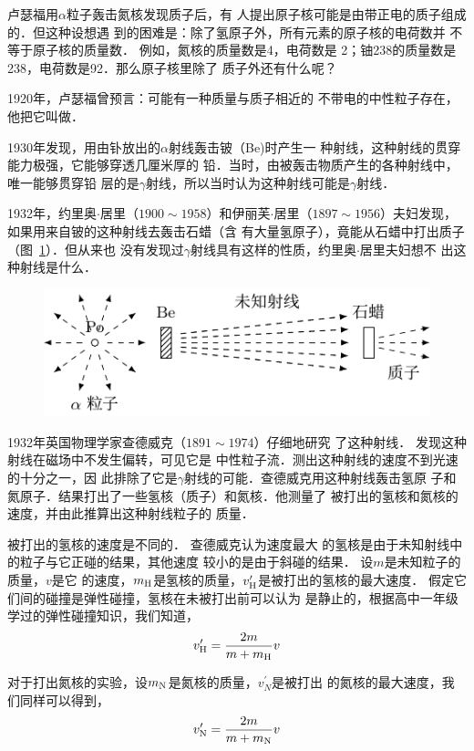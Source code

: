 卢瑟福用$\alpha$粒子轰击氮核发现质子后，有
人提出原子核可能是由带正电的质子组成的．但这种设想遇
到的困难是：除了氢原子外，所有元素的原子核的电荷数并
不等于原子核的质量数．
例如，氮核的质量数是4，电荷数是
2；铀238的质量数是238，电荷数是92．那么原子核里除了
质子外还有什么呢？

1920年，卢瑟福曾预言：可能有一种质量与质子相近的
不带电的中性粒子存在，他把它叫做．

1930年发现，用由钋放出的$\alpha$射线轰击铍（Be)时产生一
种射线，这种射线的贯穿能力极强，它能够穿透几厘米厚的
铅．当时，由被轰击物质产生的各种射线中，唯一能够贯穿铅
层的是$\gamma$射线，所以当时认为这种射线可能是$\gamma$射线．

1932年，约里奥$\cdot$居里（$1900 \sim 1958$）和伊丽芙$\cdot$居里（$1897 \sim 1956$）夫妇发现，如果用来自铍的这种射线去轰击石蜡（含
有大量氢原子），竟能从石蜡中打出质子（图~\ref{fig_C_9-8}）．但从来也
没有发现过$\gamma$射线具有这样的性质，约里奥$\cdot$居里夫妇想不
出这种射线是什么．
\begin{figure}[htbp]
    \centering
    \includegraphics{fig/C/9-8.pdf}
    \caption{}\label{fig_C_9-8}
\end{figure}

1932年英国物理学家查德威克（$1891 \sim 1974$）仔细地研究
了这种射线．
发现这种射线在磁场中不发生偏转，可见它是
中性粒子流．测出这种射线的速度不到光速的十分之一，因
此排除了它是$\gamma$射线的可能．查德威克用这种射线轰击氢原
子和氮原子．结果打出了一些氢核（质子）和氮核．他测量了
被打出的氢核和氮核的速度，并由此推算出这种射线粒子的
质量．

被打出的氢核的速度是不同的．
查德威克认为速度最大
的氢核是由于未知射线中的粒子与它正碰的结果，其他速度
较小的是由于斜碰的结果．
设$m$是未知粒子的质量，$v$是它
的速度，$m_{\rm H}$是氢核的质量，$v'_{\rm H}$是被打出的氢核的最大速度．
假定它们间的碰撞是弹性碰撞，氢核在未被打出前可以认为
是静止的，根据高中一年级学过的弹性碰撞知识，我们知道，
\[ v'_{\rm H}=\frac{2m}{m+m_{\rm H}}v \]

对于打出氮核的实验，设$m_{\rm N}$是氮核的质量，$v^{\prime}_N$是被打出
的氮核的最大速度，我们同样可以得到，
\[ v'_{\rm N}=\frac{2m}{m+m_{\rm N}}v\]


